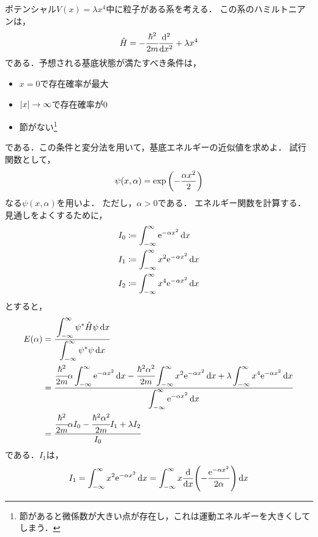 \documentclass{report}
\begin{document}
  \begin{myex}{}{}
    ポテンシャル$V(x) = \lambda x^4$中に粒子がある系を考える．
    この系のハミルトニアンは，
    \begin{align}
      \hat{H} = -\cfrac{\hbar^2}{2m}\dv[2]{x} + \lambda x^4
    \end{align}
    である．予想される基底状態が満たすべき条件は，
    \begin{itemize}
      \item $x = 0$で存在確率が最大
      \item $\abs{x} \to \infty$で存在確率が0
      \item 節がない\footnote{節があると微係数が大きい点が存在し，これは運動エネルギーを大きくしてしまう．}
    \end{itemize}
    である．この条件と変分法を用いて，基底エネルギーの近似値を求めよ．
    試行関数として，
    \begin{align}
      \psi(x, \alpha) = \exp\qty(-\frac{\alpha x^2}{2})
    \end{align}
    なる$\psi(x, \alpha)$を用いよ．
    ただし，$\alpha > 0$である．
    \tcblower
    エネルギー関数を計算する．
    見通しをよくするために，
    \begin{align}
      I_0 &\coloneqq \int_{-\infty}^{\infty}\mathrm{e}^{-\alpha x^2} \dd{x} \\ 
      I_1 &\coloneqq \int_{-\infty}^{\infty}x^2\mathrm{e}^{-\alpha x^2} \dd{x} \\ 
      I_2 &\coloneqq \int_{-\infty}^{\infty}x^4\mathrm{e}^{-\alpha x^2} \dd{x} 
    \end{align}
    とすると，
    \begin{align}
      E(\alpha) &= \cfrac{\displaystyle\int_{-\infty}^{\infty} \psi^{*}\hat{H}\psi \dd{x}}{\displaystyle\int_{-\infty}^{\infty} \psi^{*}\psi \dd{x}} \\ 
      &= \frac{\displaystyle \cfrac{\hbar^2}{2m}\alpha\int_{-\infty}^{\infty}\mathrm{e}^{-\alpha x^2}\dd{x} -\cfrac{\hbar^2\alpha^2}{2m}\int_{-\infty}^{\infty}x^2\mathrm{e}^{-\alpha x^2} \dd{x} + \lambda\int_{-\infty}^{\infty}x^4\mathrm{e}^{-\alpha x^2}\dd{x}}{\displaystyle\int_{-\infty}^{\infty}\mathrm{e}^{-\alpha x^2}\dd{x}} \\
      &= \frac{\cfrac{\hbar^2}{2m}\alpha I_0 - \cfrac{\hbar^2\alpha^2}{2m}I_1 + \lambda I_2}{I_0}\label{E1}
    \end{align}
    である．$I_1$は，
    \begin{align}
      I_1 = \int_{-\infty}^{\infty}x^2\e^{-\alpha x^2}\dd{x} &= \int_{-\infty}^{\infty}x\dv{x}\qty(-\frac{\e^{-\alpha x^2}}{2\alpha}) \dd{x} \\ 

\end{align}
\end{myex}
\end{document}
